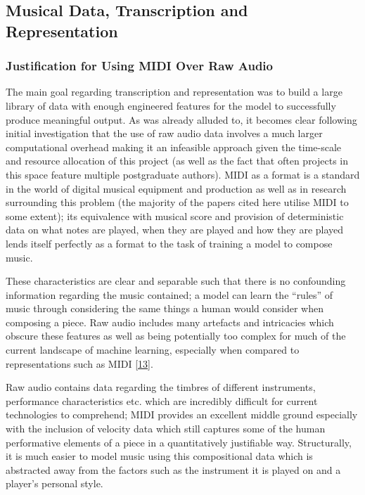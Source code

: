 \documentclass[12pt,]{article}
\begin{document}
\hypertarget{musical-data-transcription-and-representation}{%
\subsection{Musical Data, Transcription and
Representation}\label{musical-data-transcription-and-representation}}

\hypertarget{justification-for-using-midi-over-raw-audio}{%
\subsubsection{Justification for Using MIDI Over Raw
Audio}\label{justification-for-using-midi-over-raw-audio}}

The main goal regarding transcription and representation was to build a
large library of data with enough engineered features for the model to
successfully produce meaningful output. As was already alluded to, it
becomes clear following initial investigation that the use of raw audio
data involves a much larger computational overhead making it an
infeasible approach given the time-scale and resource allocation of this
project (as well as the fact that often projects in this space feature
multiple postgraduate authors). MIDI as a format is a standard in the
world of digital musical equipment and production as well as in research
surrounding this problem (the majority of the papers cited here utilise
MIDI to some extent); its equivalence with musical score and provision
of deterministic data on what notes are played, when they are played and
how they are played lends itself perfectly as a format to the task of
training a model to compose music.

These characteristics are clear and separable such that there is no
confounding information regarding the music contained; a model can learn
the ``rules'' of music through considering the same things a human would
consider when composing a piece. Raw audio includes many artefacts and
intricacies which obscure these features as well as being potentially
too complex for much of the current landscape of machine learning,
especially when compared to representations such as MIDI
{[}\protect\hyperlink{ref-dai2018music}{13}{]}.

Raw audio contains data regarding the timbres of different instruments,
performance characteristics etc. which are incredibly difficult for
current technologies to comprehend; MIDI provides an excellent middle
ground especially with the inclusion of velocity data which still
captures some of the human performative elements of a piece in a
quantitatively justifiable way. Structurally, it is much easier to model
music using this compositional data which is abstracted away from the
factors such as the instrument it is played on and a player's personal
style.
\end{document}
